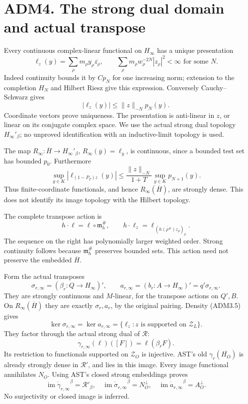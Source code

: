 \section{ADM4. The strong dual domain and actual
transpose}\label{adm4.-the-strong-dual-domain-and-actual-transpose}

Every continuous complex-linear functional on \(H_\infty\) has a unique
presentation \[
\ell_z(y)=\sum_\rho m_\rho y_\rho\overline{z_\rho},\qquad
\sum_\rho m_\rho w_\rho^{-2N}|z_\rho|^2<\infty
\text{ for some }N.
\tag{ADM4.1}
\] Indeed continuity bounds it by \(Cp_N\) for one increasing norm;
extension to the completion \(H_N\) and Hilbert Riesz give this
expression. Conversely Cauchy--Schwarz gives \[
|\ell_z(y)|\le\|z\|_{-N}p_N(y).
\tag{ADM4.2}
\] Coordinate vectors prove uniqueness. The presentation is anti-linear
in \(z\), or linear on its conjugate complex space. We use the actual
strong dual topology \(H_\infty'{}_\beta\); no unproved identification
with an inductive-limit topology is used.

The map \(R_\infty:\overline H\to H_\infty'{}_\beta\),
\(R_\infty(\overline y)=\ell_y\), is continuous, since a bounded test
set has bounded \(p_0\). Furthermore \[
\sup_{y\in K}|\ell_{(1-P_T)z}(y)|
\le\frac{\|z\|_{-N}}{1+T}\sup_{y\in K}p_{N+1}(y).
\tag{ADM4.3}
\] Thus finite-coordinate functionals, and hence
\(R_\infty(\overline H)\), are strongly dense. This does not identify
its image topology with the Hilbert topology.

The complete transpose action is \[
h\cdot\ell=\ell\circ\mathfrak m_h^\#,\qquad
h\cdot\ell_z=\ell_{\,(\overline{h(\rho^\#)}z_\rho)_\rho}.
\tag{ADM4.4}
\] The sequence on the right has polynomially larger weighted order.
Strong continuity follows because \(\mathfrak m_h^\#\) preserves bounded
sets. This action need not preserve the embedded \(\overline H\).

Form the actual transposes \[
\sigma_{r,\infty}=(\beta_r:Q\to H_\infty)',\qquad
a_{r,\infty}=(b_r:A\to H_\infty)'=q'\sigma_{r,\infty}.
\tag{ADM4.5}
\] They are strongly continuous and \(M\)-linear, for the transpose
actions on \(Q',B\). On \(R_\infty(\overline H)\) they are exactly
\(\sigma_r,a_r\), by the original pairing. Density (ADM3.5) gives \[
\ker\sigma_{r,\infty}=\ker a_{r,\infty}
=\{\ell_z:z\text{ is supported on }\mathscr Z_L\}.
\tag{ADM4.6}
\] They factor through the actual strong dual of \(\mathcal R\): \[
\gamma_{r,\infty}(\ell)([F])=\ell(\beta_rF).
\tag{ADM4.7}
\] Its restriction to functionals supported on \(\mathscr Z_O\) is
injective. AST's old \(\gamma_r(\overline{H_O})\) is already strongly
dense in \(\mathcal R'\), and lies in this image. Every image functional
annihilates \(N_O\). Using AST's closed strong embeddings proves \[
\overline{\operatorname{im}\gamma_{r,\infty}}^\beta=\mathcal R'_\beta,\quad
\overline{\operatorname{im}\sigma_{r,\infty}}^\beta=N_O^\perp,\quad
\overline{\operatorname{im}a_{r,\infty}}^\beta=A_O^\perp.
\tag{ADM4.8}
\] No surjectivity or closed image is inferred.

